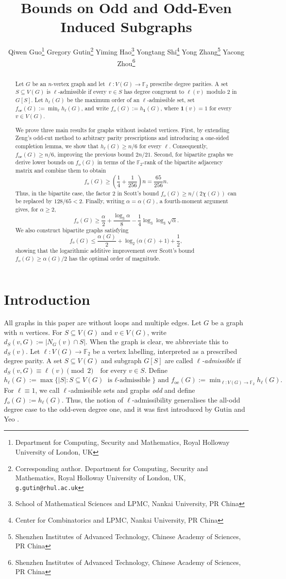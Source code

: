 \documentclass[11pt]{article}
\title{Bounds on Odd and Odd-Even Induced Subgraphs}
\author{Qiwen Guo\thanks{Department for Computing, Security and Mathematics, Royal Holloway University of London, UK} \hspace{2mm} 
	Gregory Gutin\thanks{Corresponding author. Department for Computing, Security and Mathematics, Royal Holloway University of London, UK, {\tt g.gutin@rhul.ac.uk}}
	\hspace{2mm} Yiming Hao\thanks{School of Mathematical Sciences and LPMC, Nankai University, PR China} 
	\hspace{2mm}  Yongtang Shi\thanks{Center for Combinatorics and LPMC, Nankai University, PR China } \hspace{2mm}
	Yong Zhang\thanks{Shenzhen Institutes of Advanced Technology, Chinese Academy of Sciences, PR China} \hspace{2mm}
	Yacong Zhou\thanks{Shenzhen Institutes of Advanced Technology, Chinese Academy of Sciences, PR China}
}
\date{}
\newcommand{\GG}[1]{{#1}}
\theoremstyle{definition}
\theoremstyle{remark}
\newcommand{\foe}{f_{\mathrm{oe}}}
\newcommand{\fo}{f_o}
\newcommand{\F}{\mathbb{F}}
\newcommand{\1}{\mathbf{1}}
\begin{document}
	\maketitle
	
	\begin{abstract}
		Let $G$ be an $n$-vertex graph and let $\ell:V(G)\to\mathbb{F}_2$
		prescribe degree parities. A set $S\subseteq V(G)$ is
		$\ell$-admissible if every $v\in S$ has degree congruent to $\ell(v)$
		modulo $2$ in $G[S]$. Let $h_\ell(G)$ be the maximum order of an
		$\ell$-admissible set, set $f_{\mathrm{oe}}(G):=\min_\ell h_\ell(G)$,
		and write $f_o(G):=h_{\mathbf{1}}(G)$, where $\mathbf{1}(v)=1$ for every $v\in V(G).$
		
		We prove three main results for graphs without isolated vertices. First,
		by extending Zeng's odd-cut method to arbitrary parity prescriptions and
		introducing a one-sided completion lemma, we show that
		$h_\ell(G)\ge n/6$ for every $\ell$. Consequently,
		$f_{\mathrm{oe}}(G)\ge n/6$, improving the previous bound $2n/21$.
		Second, for bipartite graphs we derive lower bounds on $f_o(G)$ in terms
		of the $\mathbb{F}_2$-rank of the bipartite adjacency matrix and combine
		them to obtain
		\[
		f_o(G)\ge \left(\frac14+\frac1{256}\right)n=\frac{65}{256}n.
		\]
		Thus, in the bipartite case, the factor $2$ in Scott's bound
		$f_o(G)\ge n/(2\chi(G))$ can be replaced by $128/65<2$.
		Finally, writing $\alpha=\alpha(G)$, a fourth-moment argument gives, for
		$\alpha\ge2$,
		\[
		f_o(G)\ge \frac{\alpha}{2}+\frac{\log_3\alpha}{8}
		-\frac14\log_3\log_3\sqrt{\alpha}.
		\]
		We also construct bipartite graphs satisfying
		\[
		f_o(G)\le \frac{\alpha(G)}2+\log_2\!\bigl(\alpha(G)+1\bigr)+\frac12,
		\]
		showing that the logarithmic additive improvement over Scott's bound
		$f_o(G)\ge\alpha(G)/2$ has the optimal order of magnitude.
	\end{abstract}
	
	\section{Introduction}
	
	All graphs in this paper are without loops and multiple edges.  Let $G$ be a graph with $n$ vertices.
	For $S\subseteq V(G)$ and
	$v\in V(G)$, write
	$
	d_S(v,G):=|N_G(v)\cap S|.
	$
	When the graph is clear, we abbreviate this to $d_S(v)$.
	Let $\ell:V(G)\to\F_2$ be a vertex labelling, interpreted as a prescribed
	degree parity.  A set $S\subseteq V(G)$ and \GG{subgraph $G[S]$ are} called \emph{$\ell$-admissible}
	if
	$
	d_S(v,G)\equiv \ell(v)\pmod 2
	\quad\text{for every }v\in S.
	$
	Define
	$
	h_\ell(G):=
	\max\bigl\{|S|:S\subseteq V(G)\text{ is $\ell$-admissible}\bigr\}
	\mbox{  and }
	\foe(G):=\min_{\ell:V(G)\to\F_2} h_\ell(G).
	$
	For $\ell\equiv 1$, \GG{we call $\ell$-admissible sets and graphs {\em odd} and} 
	define $\fo(G):= h_\ell(G).$ \GG{Thus, the notion of $\ell$-admissibility
	generalises the all-odd degree case
	to the odd-even degree one, and it was first introduced by Gutin and Yeo \cite{GutinYeo2022}.} 
	
\end{document}
